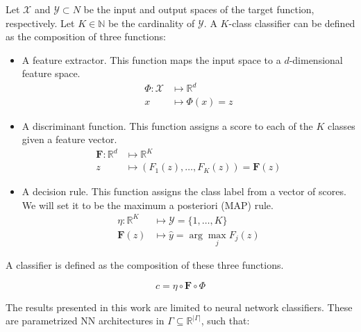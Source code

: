 \begin{definition}[Classifier]\label{def:classifier}
    Let $\mathcal{X}$ and $\mathcal{Y} \subset N$ be the input and output spaces of the target function, respectively.
    Let $K \in \mathbb{N}$ be the cardinality of $\mathcal{Y}$.
    A $K$-class classifier can be defined as the 
    composition of three functions:

    \begin{itemize}
        \item A feature extractor. This function maps the input space to a $d$-dimensional feature space.
            $$ 
            \begin{aligned}
                \Phi: \mathcal{X} & \longmapsto \mathbb{R}^d \\
                x & \longmapsto \Phi(x) = z
            \end{aligned}
            $$

        \item A discriminant function. This function assigns a score
        to each of the $K$ classes given a feature vector. 
            $$
            \begin{aligned}
                \bm{F}: \mathbb{R}^d  & \longmapsto \mathbb{R}^K \\
                z & \longmapsto \left ( F_1(z), \dots, F_K(z) \right ) = \bm{F}(z)
            \end{aligned}
            $$
        \item A decision rule. This function assigns the class label from a vector of scores.
        We will set it to be the maximum a posteriori (MAP) rule.
            $$
                \begin{aligned}
                    \eta: \mathbb{R}^K & \longmapsto \mathcal{Y} = \{1, \dots, K \} \\
                    \bm{F}(z) & \longmapsto \hat{y} = \arg \max_{j} F_j(z)
                \end{aligned}
            $$
    \end{itemize}

    A classifier is defined as the composition of these three functions.

    $$
    c = \eta \circ \bm{F} \circ \Phi
    $$
\end{definition}

The results presented in this work are limited to neural network classifiers. These are
parametrized NN architectures in $\Gamma \subseteq \mathbb{R}^{|\Gamma|}$, such that:

